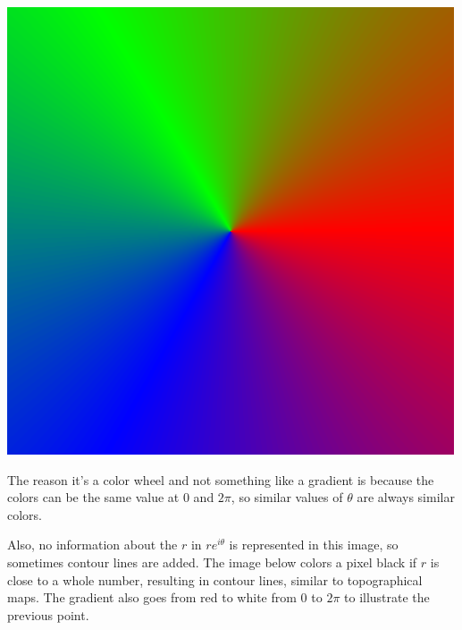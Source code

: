 \documentclass[xhtml, mathjax]{article}
\begin{document}
    \begin{center}
      \includegraphics{z_color.gif}
    \end{center}

    The reason it's a color wheel and not something like a gradient is because
    the colors can be the same value at $0$ and $2\pi$, so similar values of
    $\theta$ are always similar colors.

    Also, no information about the $r$ in $re^{i\theta}$ is represented in this
    image, so sometimes contour lines are added. The image below colors a pixel
    black if $r$ is close to a whole number, resulting in contour lines,
    similar to topographical maps. The gradient also goes from red to white from
    $0$ to $2\pi$ to illustrate the previous point.
\end{document}
